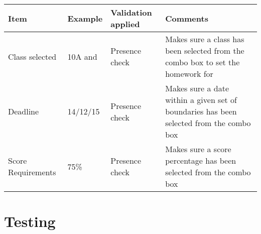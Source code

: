 \begin{center}
\begin{tabular}{|p{2cm}|p{3cm}|p{4cm}|p{4cm}|} \hline
\textbf{Item} & \textbf{Example} & \textbf{Validation applied} & \textbf{Comments} \\ \hline
Class selected & 10A and & Presence check & Makes sure a class has been selected from the combo box to set the homework for \\ \hline
Deadline & 14/12/15 & Presence check & Makes sure a date within a given set of boundaries has been selected from the combo box \\ \hline
Score Requirements & 75\% & Presence check & Makes sure a score percentage has been selected from the combo box \\ \hline
\end{tabular}
\end{center}

\section{Testing}

